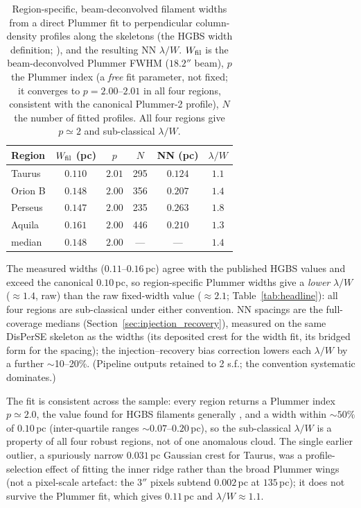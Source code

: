 \documentclass[usenatbib,twoside,twocolumn]{mnras}
\begin{document}
\begin{table}
\caption{Region-specific, beam-deconvolved filament widths from a direct Plummer fit to perpendicular column-density profiles along the skeletons (the HGBS width definition; \citealt{Arzoumanian2019}), and the resulting NN $\lambda/W$. $W_{\rm fil}$ is the beam-deconvolved Plummer FWHM ($18.2''$ beam), $p$ the Plummer index (a \emph{free} fit parameter, not fixed; it converges to $p=2.00$--$2.01$ in all four regions, consistent with the canonical Plummer-2 profile), $N$ the number of fitted profiles. All four regions give $p\simeq2$ and sub-classical $\lambda/W$.}
\label{tab:widths}
\footnotesize
\setlength{\tabcolsep}{3pt}
\begin{tabular}{p{1.7cm}ccccc}
\toprule
Region & $W_{\rm fil}$ (pc) & $p$ & $N$ & NN (pc) & $\lambda/W$ \\
\midrule
Taurus  & $0.110$ & $2.01$ & 295 & $0.124$ & $1.1$ \\
Orion B & $0.148$ & $2.00$ & 356 & $0.207$ & $1.4$ \\
Perseus & $0.147$ & $2.00$ & 235 & $0.263$ & $1.8$ \\
Aquila  & $0.161$ & $2.00$ & 446 & $0.210$ & $1.3$ \\
\midrule
median  & $0.148$ & $2.00$ & --- & --- & $1.4$ \\
\bottomrule
\end{tabular}
\par\vspace{2pt}
\footnotesize The measured widths ($0.11$--$0.16$\,pc) agree with the published HGBS values and exceed the canonical $0.10$\,pc, so region-specific Plummer widths give a \emph{lower} $\lambda/W$ ($\approx1.4$, raw) than the raw fixed-width value ($\approx2.1$; Table~\ref{tab:headline}): all four regions are sub-classical under either convention. NN spacings are the full-coverage medians (Section~\ref{sec:injection_recovery}), measured on the same DisPerSE skeleton as the widths (its deposited crest for the width fit, its bridged form for the spacing); the injection--recovery bias correction lowers each $\lambda/W$ by a further $\sim$10--20\%. (Pipeline outputs retained to 2 s.f.; the convention systematic dominates.)
\end{table}

The fit is consistent across the sample: every region returns a Plummer index $p\simeq2.0$, the value found for HGBS filaments generally \citep{Arzoumanian2019}, and a width within $\sim50\%$ of $0.10$\,pc (inter-quartile ranges $\sim0.07$--$0.20$\,pc), so the sub-classical $\lambda/W$ is a property of all four robust regions, not of one anomalous cloud. The single earlier outlier, a spuriously narrow $0.031$\,pc Gaussian crest for Taurus, was a profile-selection effect of fitting the inner ridge rather than the broad Plummer wings (not a pixel-scale artefact: the $3''$ pixels subtend $0.002$\,pc at $135$\,pc); it does not survive the Plummer fit, which gives $0.11$\,pc and $\lambda/W\approx1.1$.
\end{document}
